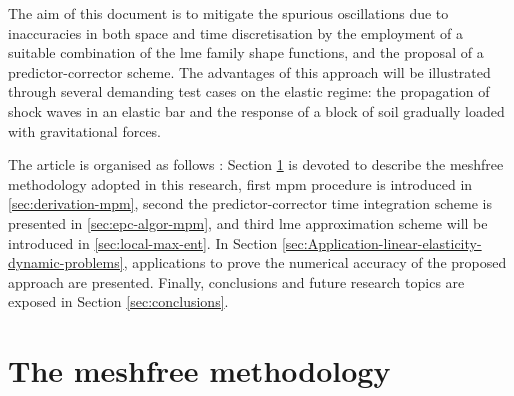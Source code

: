 \documentclass[preprint,12pt,a4paper]{elsarticle}
\begin{document}
The aim of this document is to mitigate the spurious oscillations due to
inaccuracies in both space and time discretisation by the employment of a
suitable combination of the \acrshort{lme} family shape functions, and the proposal of a predictor-corrector scheme. The advantages of
this approach will be illustrated through several demanding test cases on the elastic regime: the
propagation of shock waves in an elastic bar and the response of a block of soil gradually loaded with gravitational forces.

The article is organised as follows : Section \ref{sec:meshfree-methodology}
is devoted to describe the meshfree methodology adopted in this
research, first \acrshort{mpm} procedure is introduced in
\ref{sec:derivation-mpm}, second the predictor-corrector
time integration scheme is presented in \ref{sec:epc-algor-mpm}, and
third \acrshort{lme} approximation scheme will be introduced in
\ref{sec:local-max-ent}. In Section
\ref{sec:Application-linear-elasticity-dynamic-problems}, applications to prove the numerical accuracy of the proposed approach are
presented. Finally, conclusions and future research topics are exposed in Section \ref{sec:conclusions}.


\section{The meshfree methodology}
\label{sec:meshfree-methodology}
\end{document}

